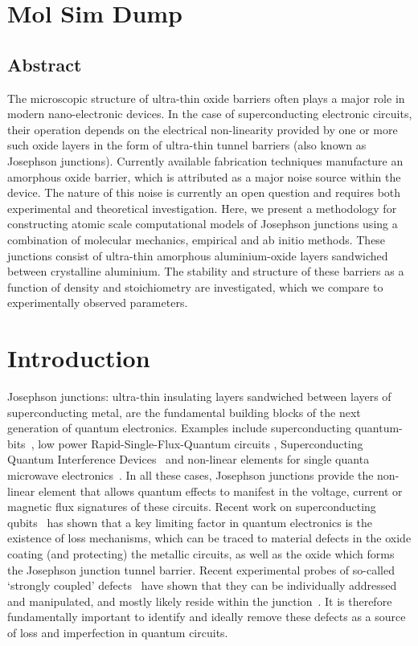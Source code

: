 \section{Mol Sim Dump}
\subsection{Abstract}
The microscopic structure of ultra-thin oxide barriers often plays a major role in modern nano-electronic devices.
In the case of superconducting electronic circuits, their operation depends on the electrical non-linearity provided by one or more such oxide layers in the form of ultra-thin tunnel barriers (also known as Josephson junctions).
Currently available fabrication techniques manufacture an amorphous oxide barrier, which is attributed as a major noise source within the device.
The nature of this noise is currently an open question and requires both experimental and theoretical investigation.
Here, we present a methodology for constructing atomic scale computational models of Josephson junctions using a combination of molecular mechanics, empirical and ab initio methods.
These junctions consist of ultra-thin amorphous aluminium-oxide layers sandwiched between crystalline aluminium. The stability and structure of these barriers as a function of density and stoichiometry are investigated, which we compare to experimentally observed parameters.


\section{Introduction}
Josephson junctions: ultra-thin insulating layers sandwiched between layers of superconducting metal, are the fundamental building blocks of the next generation of quantum electronics.
Examples include superconducting quantum-bits~\cite{Clarke1988,Martinis2002,Plourde2005,Deppe2007,Schreier2008}, low power Rapid-Single-Flux-Quantum circuits \cite{Mukhanov1987}, Superconducting Quantum Interference Devices~\cite{Weinstock1996} and non-linear elements for single quanta microwave electronics~\cite{Astafiev2007, Astafiev2010, Wilson2011, Hoi2013, Hoi2013a}.
In all these cases, Josephson junctions provide the non-linear element that allows quantum effects to manifest in the voltage, current or magnetic flux signatures of these circuits.
Recent work on superconducting qubits~\cite{Dutta1981, Shnirman2005} has shown that a key limiting factor in quantum electronics is the existence of loss mechanisms, which can be traced to material defects in the oxide coating (and protecting) the metallic circuits, as well as the oxide which forms the Josephson junction tunnel barrier.
Recent experimental probes of so-called `strongly coupled' defects~\cite{Neeley2008, Lupascu2009, Lisenfeld2010} have shown that they can be individually addressed and manipulated, and mostly likely reside within the junction~\cite{Lacquaniti2012}.
It is therefore fundamentally important to identify and ideally remove these defects as a source of loss and imperfection in quantum circuits.

